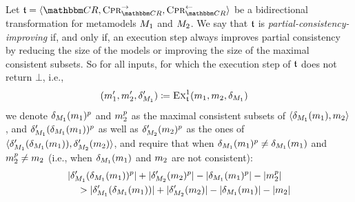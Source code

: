 \begin{definition}
    \label{def:partialconsistencyimprovingtransformation}
    Let $\transformation{t} = \tupled{\consistencyrelationset{CR}, \consistencypreservationrule{\consistencyrelationset{CR}}^{\rightarrow}, \consistencypreservationrule{\consistencyrelationset{CR}}^{\leftarrow}}$ be a bidirectional transformation for metamodels $\metamodel{M}{1}$ and $\metamodel{M}{2}$.
    We say that $\transformation{t}$ is \emph{partial-consistency-improving} if, and only if, an execution step always improves partial consistency by reducing the size of the models or improving the size of the maximal consistent subsets.
    So for all inputs, for which the execution step of $\transformation{t}$ does not return $\bot$, i.e.,
    \begin{align*}
        & (\model{m}{1}', \model{m}{2}', \change{\metamodel{M}{1}}') \equalsperdefinition \function{Ex}_{\transformation{t}}^1(\model{m}{1}, \model{m}{2}, \change{\metamodel{M}{1}})
    \end{align*}
    we denote $\change{\metamodel{M}{1}}(\model{m}{1})^p$ and $\model{m}{2}^p$ as the maximal consistent subsets of $\tupled{\change{\metamodel{M}{1}}(\model{m}{1}), \model{m}{2}}$, and $\change{\metamodel{M}{1}}'(\change{\metamodel{M}{1}}(\model{m}{1}))^p$ as well as $\change{\metamodel{M}{2}}'(\model{m}{2})^p$ as the ones of $\tupled{\change{\metamodel{M}{1}}'(\change{\metamodel{M}{1}}(\model{m}{1})), \change{\metamodel{M}{2}}'(\model{m}{2})}$,
    and require that when $\change{\metamodel{M}{1}}(\model{m}{1})^p \neq \change{\metamodel{M}{1}}(\model{m}{1})$ and $\model{m}{2}^p \neq \model{m}{2}$ (i.e., when $\change{\metamodel{M}{1}}(\model{m}{1})$ and $\model{m}{2}$ are not consistent):
    \begin{align*}
        &
        \abs{\change{\metamodel{M}{1}}'(\change{\metamodel{M}{1}}(\model{m}{1}))^p} + \abs{\change{\metamodel{M}{2}}'(\model{m}{2})^p} 
        - \abs{\change{\metamodel{M}{1}}(\model{m}{1})^p} - \abs{\model{m}{2}^p} \\
        & \formulaskip
        > \abs{\change{\metamodel{M}{1}}'(\change{\metamodel{M}{1}}(\model{m}{1}))} + \abs{\change{\metamodel{M}{2}}'(\model{m}{2})} 
        - \abs{\change{\metamodel{M}{1}}(\model{m}{1})} - \abs{\model{m}{2}}
    \end{align*}
\end{definition}


